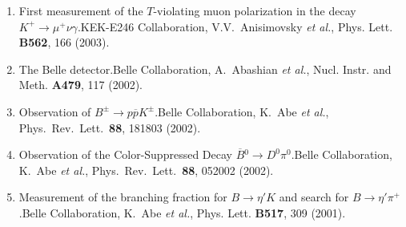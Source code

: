 \documentclass[10pt,a4paper]{article}
\def\mypub#1#2#3{{#1.}\newline #2, #3.}
\def\mybpub#1#2#3{{\boldmath \bf #1.}\newline #2, #3.}
\def\cited#1{Cited $\ge$ #1}
\def\NIMA#1{Nucl. Instr. and Meth. \textbf{A#1}}
\def\PLB#1{Phys. Lett. {\bf B#1}}
\def\PRL{Phys.\ Rev.\ Lett.\ }
\def\etal{{\it et al.}}
\def\belle{Belle Collaboration, K.~Abe \etal }
\begin{document}
\begin{enumerate}
\item
\mypub{First measurement of the $T$-violating muon polarization in the decay $K^+ \to \mu^+ \nu \gamma$}
{KEK-E246 Collaboration, V.V.~Anisimovsky \etal}
{\PLB{562}, 166 (2003)}

\item 
\mypub{The Belle detector}
{Belle Collaboration, A.~Abashian \etal}
{\NIMA{479}, 117 (2002)}

\item
\mypub{Observation of $B^{\pm}\to p \overline{p} K^{\pm}$}
{\belle}
{\PRL {\bf 88}, 181803 (2002)}
\newline [{\it Equal contribution} to the corresponding author]

\item
\mypub{Observation of the Color-Suppressed Decay $\overline{B}{}^0
\to D^0 \pi^0$}
{\belle}
{\PRL {\bf 88}, 052002 (2002)}	%
\newline[{\it Equal contribution} to the corresponding author]

\item
\mypub{Measurement of the branching fraction for $B \to \eta' K$ and
search for  $B \to \eta' \pi^+$}
{\belle}
{\PLB{517}, 309 (2001)}







\end{enumerate}
\end{document}

